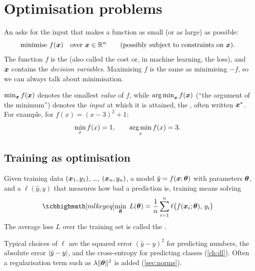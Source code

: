 \section{Optimisation problems}\label{sec:optimisation-problems}

An  asks for the input that makes a function as
small (or as large) as possible:
\[
  \text{minimise } f(\bm{x}) \quad\text{over } \bm{x} \in \mathbb{R}^n
  \qquad (\text{possibly subject to constraints on } \bm{x}).
\]
The function $f$ is the  (also called the cost or, in
machine learning, the loss), and $\bm{x}$ contains the \emph{decision variables}.
Maximising $f$ is the same as minimising $-f$, so we can always talk about
minimisation.

\begin{notation}
$\min_{\bm{x}} f(\bm{x})$ denotes the smallest \emph{value} of $f$, while
$\operatorname*{arg\,min}_{\bm{x}} f(\bm{x})$ (``the argument of the minimum'') denotes the
\emph{input} at which it is attained, the , often written
$\bm{x}^*$. For example, for $f(x) = (x - 3)^2 + 1$:
\[
  \min_x f(x) = 1, \qquad \operatorname*{arg\,min}_x f(x) = 3 .
\]
\end{notation}

\subsection{Training as optimisation}

\begin{definition}\label{def:erm}
Given training data $(\bm{x}_1, y_1)$, \dots, $(\bm{x}_n, y_n)$, a model
$\hat y = f(\bm{x}; \bm{\theta})$ with parameters $\bm{\theta}$, and a
 $\ell(\hat y, y)$ that measures how bad a prediction is,
training means solving
\[
  \keyeq{\min_{\vtheta}\; L(\vtheta) = \frac1n\sum_{i=1}^{n}
  \ell\bigl(f(\vx_i; \vtheta),\, y_i\bigr)}
\]
The average loss $L$ over the training set is called the .
\end{definition}

Typical choices of $\ell$ are the squared error $(\hat y - y)^2$ for predicting
numbers, the absolute error $\lvert\hat y - y\rvert$, and the cross-entropy for
predicting classes (\cref{ch:dl}). Often a regularisation term such as
$\lambda\lVert\bm{\theta}\rVert^2$ is added (\cref{sec:norms}).

\sectionexercises

